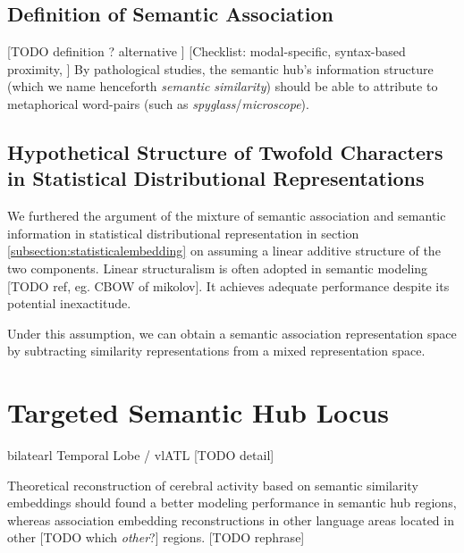 \subsection{Definition of Semantic Association}  
[TODO definition ? alternative ]
[Checklist: modal-specific, syntax-based proximity, ]
By pathological studies, the semantic hub's information structure (which we name henceforth \emph{semantic similarity}) should be able to attribute to metaphorical word-pairs (such as \emph{spyglass}/\emph{microscope}). 

\subsection{Hypothetical Structure of Twofold Characters in Statistical Distributional Representations}

\label{subsection:hyplinearsemantics}

 

We furthered the argument of the mixture of semantic association and semantic information in statistical distributional representation in section \ref{subsection:statisticalembedding} on assuming a linear additive structure of the two components. Linear structuralism is often adopted in semantic modeling [TODO ref, eg. CBOW of mikolov]. It achieves adequate performance despite its potential inexactitude. 

Under this assumption, we can obtain a semantic association representation space by subtracting similarity representations from a mixed representation space.

\section{Targeted Semantic Hub Locus}

bilatearl Temporal Lobe / vlATL [TODO detail]

Theoretical reconstruction of cerebral activity based on semantic similarity embeddings should found a better modeling performance in semantic hub regions, whereas association embedding reconstructions in other language areas located in other [TODO which \emph{other}?] regions. [TODO rephrase]